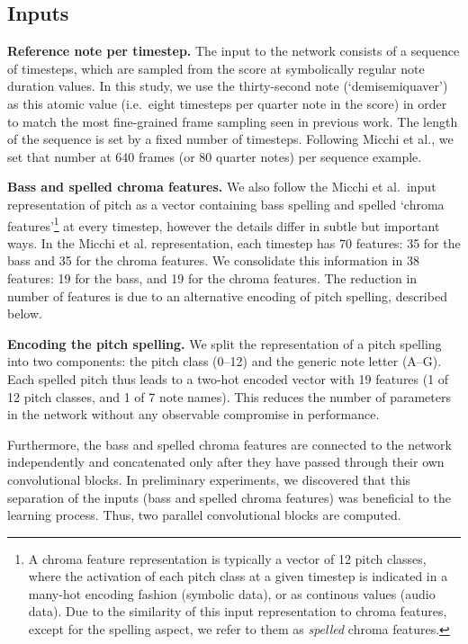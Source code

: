 \documentclass{article}
\newcommand{\guide}[1]{}
\begin{document}
\subsection{Inputs}

\textbf{Reference note per timestep.}
The input to the network consists of a sequence of timesteps, which are sampled from the score at symbolically regular note duration values.
In this study, we use the thirty-second note (`demisemiquaver') as this atomic value (i.e.~eight timesteps per quarter note in the score) in order to match the most fine-grained frame sampling seen in previous work. The length of the sequence is set by a fixed number of timesteps. Following Micchi et al., we set that number at 640 frames (or 80 quarter notes) per sequence example.

\textbf{Bass and spelled chroma features.}
We also follow the Micchi et al.~input representation of pitch as a vector containing bass spelling and spelled `chroma features'\footnote{A chroma feature representation is typically a vector of 12 pitch classes, where the activation of each pitch class at a given timestep is indicated in a many-hot encoding fashion (symbolic data), or as continous values (audio data). 
Due to the similarity of this input representation to chroma features, except for the spelling aspect, we refer to them as \emph{spelled} chroma features.} at every timestep, however the details differ in subtle but important ways. 
In the Micchi et al. representation, each timestep has 70 features: 35 for the bass and 35 for the chroma features. 
We consolidate this information in 38 features: 19 for the bass, and 19 for the chroma features. The reduction in number of features is due to an alternative encoding of pitch spelling, described below.

\textbf{Encoding the pitch spelling.}
We split the representation of a pitch spelling into two components: the pitch class (0--12) and the generic note letter (A--G).
Each spelled pitch thus leads to a two-hot encoded vector with 19 features (1 of 12 pitch classes, and 1 of 7 note names).
This reduces the number of parameters in the network without any observable compromise in performance.

\guide{Separating the inputs.}
Furthermore, the bass and spelled chroma features are connected to the network independently and concatenated only after they have passed through their own convolutional blocks. 
In preliminary experiments, we discovered that this separation of the inputs (bass and spelled chroma features) was beneficial to the learning process.
Thus, two parallel convolutional blocks are computed.
\end{document}
